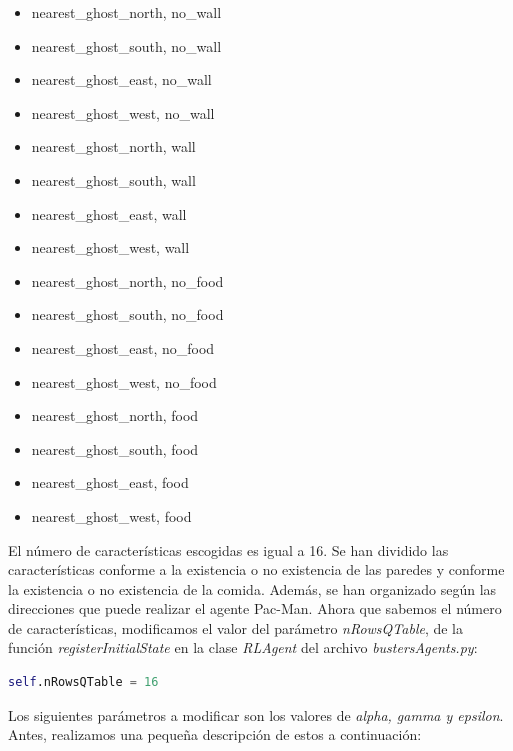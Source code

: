 \documentclass[11pt]{exam}
\begin{document}
\begin{multicols}{2}
	\begin{itemize}
		\item nearest\_ghost\_north, no\_wall
		\item nearest\_ghost\_south, no\_wall
		\item nearest\_ghost\_east, no\_wall
		\item nearest\_ghost\_west, no\_wall
		\item nearest\_ghost\_north, wall
		\item nearest\_ghost\_south, wall
		\item nearest\_ghost\_east, wall
		\item nearest\_ghost\_west, wall
	\end{itemize}
	\columnbreak
	\begin{itemize}
		\item nearest\_ghost\_north, no\_food
		\item nearest\_ghost\_south, no\_food
		\item nearest\_ghost\_east, no\_food
		\item nearest\_ghost\_west, no\_food
		\item nearest\_ghost\_north, food
		\item nearest\_ghost\_south, food
		\item nearest\_ghost\_east, food
		\item nearest\_ghost\_west, food
	\end{itemize}
\end{multicols}
\vspace*{3mm}

El número de características escogidas es igual a 16. Se han dividido las características conforme a la existencia o no existencia de las paredes y conforme la existencia o no existencia de la comida. Además, se han organizado según las direcciones que puede realizar el agente Pac-Man. Ahora que sabemos el número de características, modificamos el valor del parámetro \textit{nRowsQTable}, de la función \textit{registerInitialState} en la clase \textit{RLAgent} del archivo \textit{bustersAgents.py}:
\vspace*{2mm}

\begin{lstlisting}[language=python, basicstyle=\footnotesize]
self.nRowsQTable = 16
\end{lstlisting}
\vspace*{2mm}

Los siguientes parámetros a modificar son los valores de \textit{alpha, gamma y epsilon}. Antes, realizamos una pequeña descripción de estos a continuación:
\end{document}
